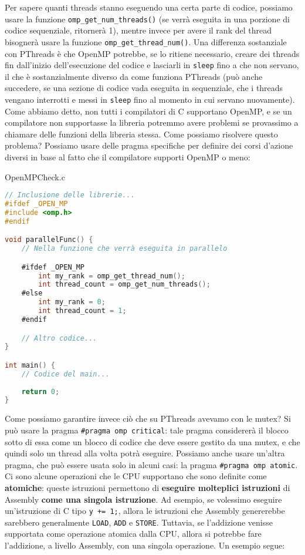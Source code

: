 Per sapere quanti threads stanno eseguendo una certa parte di codice, possiamo usare la funzione \verb|omp_get_num_threads()| (se verrà eseguita in una porzione di codice sequenziale, ritornerà 1), mentre invece per avere il rank del thread bisognerà usare la funzione \verb|omp_get_thread_num()|.
\nl
Una differenza sostanziale con PThreads è che OpenMP potrebbe, se lo ritiene necessario, creare dei threads fin dall'inizio dell'esecuzione del codice e lasciarli in \verb|sleep| fino a che non servano, il che è sostanzialmente diverso da come funziona PThreads (può anche succedere, se una sezione di codice vada eseguita in sequenziale, che i threads vengano interrotti e messi in \verb|sleep| fino al momento in cui servano nuovamente).
\nl
Come abbiamo detto, non tutti i compilatori di C supportano OpenMP, e se un compilatore non supportasse la libreria potremmo avere problemi se provassimo a chiamare delle funzioni della libreria stessa. Come possiamo risolvere questo problema? Possiamo usare delle pragma specifiche per definire dei corsi d'azione diversi in base al fatto che il compilatore supporti OpenMP o meno:
\pagebreak
\begin{codeblock}{OpenMPCheck.c}
    \begin{lstlisting}[language = C]
// Inclusione delle librerie...
#ifdef _OPEN_MP
#include <omp.h>
#endif

void parallelFunc() {
    // Nella funzione che verrà eseguita in parallelo

    #ifdef _OPEN_MP
        int my_rank = omp_get_thread_num();
        int thread_count = omp_get_num_threads();
    #else
        int my_rank = 0;
        int thread_count = 1;
    #endif

    // Altro codice...
}

int main() {
    // Codice del main...
    
    return 0;
}\end{lstlisting}
\end{codeblock}

Come possiamo garantire invece ciò che su PThreads avevamo con le mutex? Si può usare la pragma \verb|#pragma omp critical|: tale pragma considererà il blocco sotto di essa come un blocco di codice che deve essere gestito da una mutex, e che quindi solo un thread alla volta potrà eseguire.
\nl
Possiamo anche usare un'altra pragma, che può essere usata solo in alcuni casi: la pragma \verb|#pragma omp atomic|. Ci sono alcune operazioni che le CPU supportano che sono definite come \textbf{atomiche}: queste istruzioni permettono di \textbf{eseguire molteplici istruzioni} di Assembly \textbf{come una singola istruzione}. Ad esempio, se volessimo eseguire un'istruzione di C tipo \verb|y += 1;|, allora le istruzioni che Assembly genererebbe sarebbero generalmente \verb|LOAD|, \verb|ADD| e \verb|STORE|. Tuttavia, se l'addizione venisse supportata come operazione atomica dalla CPU, allora si potrebbe fare l'addizione, a livello Assembly, con una singola operazione. Un esempio segue:

